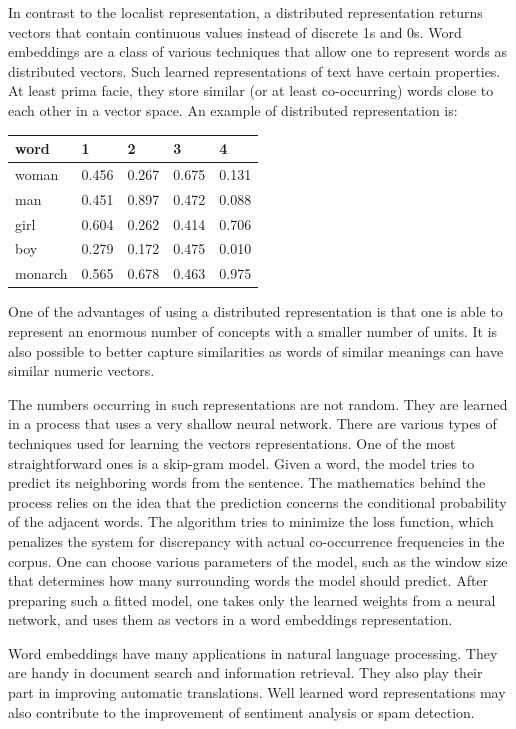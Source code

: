 \documentclass[
  12pt,
]{book}
\begin{document}
In contrast to the localist representation, a distributed representation returns vectors that contain continuous values instead of discrete 1s and 0s. Word embeddings are a class of various techniques that allow one to represent words as distributed vectors. Such learned representations of text have certain properties. At least prima facie, they store similar (or at least co-occurring) words close to each other in a vector space. An example of distributed representation is:

\begin{longtable}[]{@{}lllll@{}}
\toprule
word & 1 & 2 & 3 & 4 \\
\midrule
\endhead
woman & 0.456 & 0.267 & 0.675 & 0.131 \\
man & 0.451 & 0.897 & 0.472 & 0.088 \\
girl & 0.604 & 0.262 & 0.414 & 0.706 \\
boy & 0.279 & 0.172 & 0.475 & 0.010 \\
monarch & 0.565 & 0.678 & 0.463 & 0.975 \\
\bottomrule
\end{longtable}

One of the advantages of using a distributed representation is that one is able to represent an enormous number of concepts with a smaller number of units. It is also possible to better capture similarities as words of similar meanings can have similar numeric vectors.

The numbers occurring in such representations are not random. They are learned in a process that uses a very shallow neural network. There are various types of techniques used for learning the vectors representations. One of the most straightforward ones is a skip-gram model.
Given a word, the model tries to predict its neighboring words from the sentence. The mathematics behind the process relies on the idea that the prediction concerns the conditional probability of the adjacent words. The algorithm tries to minimize the loss function, which penalizes the system for discrepancy with actual co-occurrence frequencies in the corpus. One can choose various parameters of the model, such as the window size that determines how many surrounding words the model should predict. After preparing such a fitted model, one takes only the learned weights from a neural network, and uses them as vectors in a word embeddings representation.

Word embeddings have many applications in natural language processing. They are handy in document search and information retrieval. They also play their part in improving automatic translations. Well learned word representations may also contribute to the improvement of sentiment analysis or spam detection.
\end{document}
